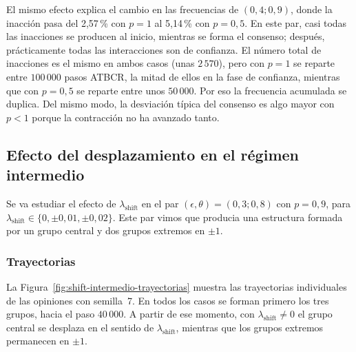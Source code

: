\documentclass[11pt,a4paper]{article}
\begin{document}
El mismo efecto explica el cambio en las frecuencias de $(0{,}4;0{,}9)$, donde la inacción pasa del 2,57\,\% con $p=1$ al 5,14\,\% con $p=0{,}5$. En este par, casi todas las inacciones se producen al inicio, mientras se forma el consenso; después, prácticamente todas las interacciones son de confianza. El número total de inacciones es el mismo en ambos casos (unas $2\,570$), pero con $p=1$ se reparte entre $100\,000$ pasos ATBCR, la mitad de ellos en la fase de confianza, mientras que con $p=0{,}5$ se reparte entre unos $50\,000$. Por eso la frecuencia acumulada se duplica. Del mismo modo, la desviación típica del consenso es algo mayor con $p<1$ porque la contracción no ha avanzado tanto.

\subsection{Efecto del desplazamiento en el régimen intermedio}
\label{sec:shift-lambda-intermedio}

Se va estudiar el efecto de $\lambda_{\mathrm{shift}}$ en el par $(\epsilon,\theta)=(0{,}3;0{,}8)$ con $p=0{,}9$, para $\lambda_{\mathrm{shift}}\in\{0,\pm0{,}01,\pm0{,}02\}$. Este par vimos que producia una estructura formada por un grupo central y dos grupos extremos en $\pm1$.

\subsubsection{Trayectorias}

La Figura~\ref{fig:shift-intermedio-trayectorias} muestra las trayectorias individuales de las opiniones con semilla~7. En todos los casos se forman primero los tres grupos, hacia el paso $40\,000$. A partir de ese momento, con $\lambda_{\mathrm{shift}}\neq0$ el grupo central se desplaza en el sentido de $\lambda_{\mathrm{shift}}$, mientras que los grupos extremos permanecen en $\pm1$.
\end{document}
